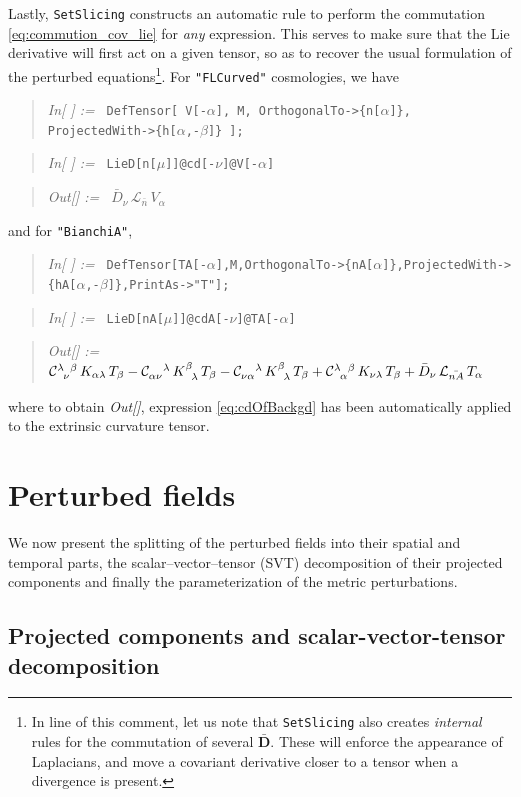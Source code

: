 \documentclass[notitlepage,onecolumn,floatfix,preprintnumbers,aps,prd,showpacs,nofootinbib,amsmath,amssymb,amsfonts]{revtex4-1}
\newcommand{\Lie}{\mathcal{L}}
\newcommand{\<}{\langle}
\renewcommand{\>}{\rangle}
\newcounter{inout}
\newcommand{\inoutput}{%
	\stepcounter{inout}%
	\theinout}
\newcommand{\mathIn}[1]{
	\begin{quotation} {\em In[\inoutput] :=\ } {\tt #1} \end{quotation}}
\newcommand{\mathOut}[1]{
	\begin{quotation} {\em Out[\theinout] :=\ } #1 \end{quotation}}
\newcommand{\ttgr}[1]{{#1}}
\newcommand{\bb}{{\ttgr{\alpha}}}
\newcommand{\cc}{{\ttgr{\beta}}}
\newcommand{\ii}{{\ttgr{\mu}}}
\newcommand{\jj}{{\ttgr{\nu}}}
\begin{document}
Lastly, {\tt SetSlicing} constructs an automatic rule to perform the commutation \eqref{eq:commution_cov_lie} 
for \textit{any} expression. This serves to make sure that the Lie derivative will first act on a given tensor, 
so as to recover the usual formulation of the perturbed equations\footnote{%
%
In line of this comment, let us note that {\tt SetSlicing} also creates \textit{internal} rules for the commutation 
of several $\bar{\bm D}$. These will enforce the appearance of Laplacians, and move a covariant derivative 
closer to a tensor when a divergence is present.
%
}. For {\tt "FLCurved"} cosmologies, we have 
%
\mathIn{DefTensor[ V[-$\bb$], M, OrthogonalTo->\{n[$\bb$]\}, ProjectedWith->\{h[$\bb$,-$\cc$]\} ];}
\mathIn{LieD[n[$\ii$]]@cd[-$\jj$]@V[-$\bb$]}
\mathOut{$\bar D_\jj \, \Lie_{\bar n} \, V_\bb$}
%
and for {\tt "BianchiA"}, 
%
\mathIn{DefTensor[TA[-$\bb$]\!,M,OrthogonalTo->\{nA[$\bb$]\},ProjectedWith->\{hA[$\bb$,-$\cc$]\},PrintAs->"T"];}
\mathIn{LieD[nA[$\ii$]]@cdA[-$\jj$]@TA[-$\bb$]}
\mathOut{${\cal C}^{\lambda \phantom{\jj} \cc}_{\phantom{\ii} \jj} \, K_{\bb \lambda} \, T_\cc 
	- {\cal C}_{\bb \jj}^{\phantom{\bb \jj} \lambda} \, K^\cc_{\phantom{\cc} \lambda} \, T_\cc 
	- {\cal C}_{\jj \bb}^{\phantom{\jj \bb} \lambda} \, K^\cc_{\phantom{\cc} \lambda} \, T_\cc 
	+ {\cal C}^{\lambda \phantom{\bb} \cc}_{\phantom{\ii} \bb} \, K_{\jj \lambda} \, T_\cc 
	+ \bar D_\jj \, {\cal L}_{\bar{nA}} \, T_\bb $}
%
where to obtain \textit{Out[\theinout]}, expression \eqref{eq:cdOfBackgd} has been automatically applied 
to the extrinsic curvature tensor. 


\section{Perturbed fields} \label{sec:pert_fields}

We now present the splitting of the perturbed fields into their spatial and temporal parts, 
the scalar--vector--tensor (SVT) decomposition of their projected components and finally the parameterization 
of the metric perturbations.


\subsection{Projected components and scalar-vector-tensor decomposition}
\end{document}
